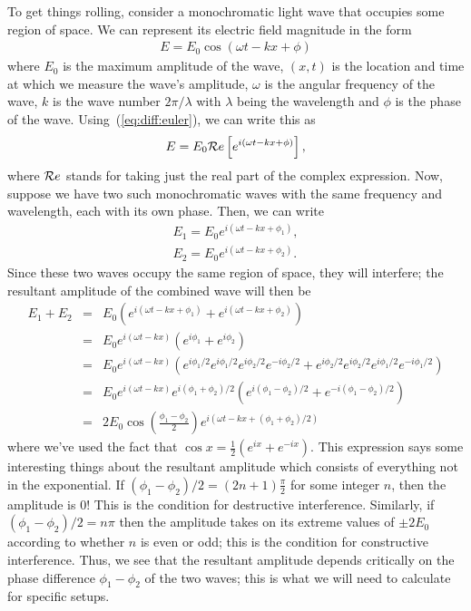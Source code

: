 To get things rolling, consider a monochromatic light wave that occupies some 
region of space. We can represent its electric field magnitude in the form
\begin{eqnarray*}
E = E_0 \cos (\omega t - k x + \phi)
\end{eqnarray*}
where $E_0$ is the maximum amplitude of the wave, $(x,t)$ is the location and 
time at which we measure the wave's amplitude, $\omega$ is the angular 
frequency of the wave, $k$ is the wave number $2 \pi/\lambda$ with $\lambda$
being the wavelength and $\phi$ is the phase of the wave. 
Using~(\ref{eq:diff:euler}), we can write this as
$$ E = E_0 {\cal R}e\left[e^{i(\omega t - k x + \phi)}\right],$$
where ${\cal R}e$ stands for taking just the real part of the complex 
expression. Now, suppose we have two such monochromatic waves with the same
frequency and wavelength, each with its own phase. Then, we can write
\begin{eqnarray*}
E_1 = E_{0} e^{i(\omega t - k x + \phi_1)},\\
E_2 = E_{0} e^{i(\omega t - k x + \phi_2)}.
\end{eqnarray*}
Since these two waves occupy the same region of space, they will interfere;
the resultant amplitude of the combined wave will then be
\begin{eqnarray*}
E_1+E_2 & = & E_0 \left( e^{i(\omega t - k x + \phi_1)} +
                         e^{i(\omega t - k x + \phi_2)} \right)\\
        & = & E_0 e^{i(\omega t - k x)} \left(e^{i\phi_1}+e^{i\phi_2}\right)\\ 
        & = & E_0 e^{i(\omega t - k x)} \left( 
               e^{i\phi_1/2}e^{i\phi_1/2}e^{i\phi_2/2}e^{-i\phi_2/2}
            +  e^{i\phi_2/2}e^{i\phi_2/2}e^{i\phi_1/2}e^{-i\phi_1/2} \right)\\
        & = & E_0 e^{i(\omega t - k x)} e^{i(\phi_1+\phi_2)/2} 
            \left( e^{i(\phi_1-\phi_2)/2} + e^{-i(\phi_1-\phi_2)/2} \right)\\
        & = & 2E_0 \cos \left( \frac{\phi_1-\phi_2}{2} \right) 
                e^{i(\omega t - k x + (\phi_1+\phi_2)/2)}
\end{eqnarray*}
where we've used the fact that $\cos x = \frac{1}{2} (e^{ix}+e^{-ix})$. This 
expression says some interesting things about the resultant amplitude which 
consists of everything not in the exponential. If $(\phi_1-\phi_2)/2 = 
(2n+1) \frac{\pi}{2}$ for some integer $n$, then the amplitude is $0$! This is 
the condition for destructive interference. Similarly, if $(\phi_1-\phi_2)/2
= n \pi$ then the amplitude takes on its extreme values of $\pm 2E_0$ 
according to whether $n$ is even or odd; this is the condition for constructive
interference. Thus, we see that the resultant amplitude depends critically on
the phase difference $\phi_1-\phi_2$ of the two waves; this is what we will 
need to calculate for specific setups.

